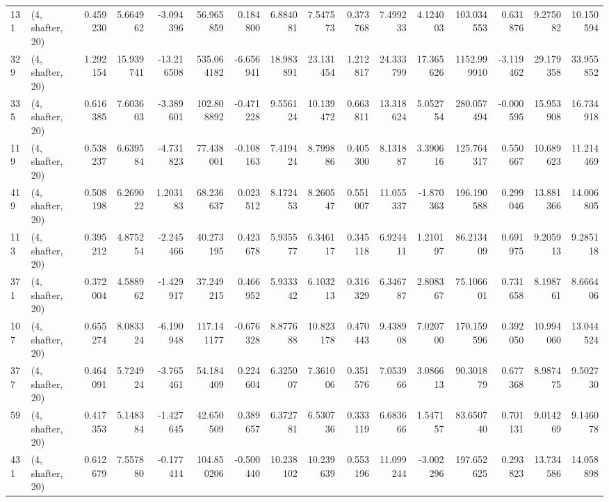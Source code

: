 \begin{tabular}{llrrrrrrrrrrrrrr}
131 &  (4, shafter, 20) &   0.459230 &   5.664962 &  -3.094396 &    56.965859 &   0.184800 &   6.884081 &   7.547573 &  0.373768 &   7.499233 &   4.124003 &    103.034553 &    0.631876 &    9.275082 &   10.150594 \\
329 &  (4, shafter, 20) &   1.292154 &  15.939741 & -13.216508 &   535.064182 &  -6.656941 &  18.983891 &  23.131454 &  1.212817 &  24.333799 &  17.365626 &   1152.999910 &   -3.119462 &   29.179358 &   33.955852 \\
335 &  (4, shafter, 20) &   0.616385 &   7.603603 &  -3.389601 &   102.808892 &  -0.471228 &   9.556124 &  10.139472 &  0.663811 &  13.318624 &   5.052754 &    280.057494 &   -0.000595 &   15.953908 &   16.734918 \\
119 &  (4, shafter, 20) &   0.538237 &   6.639584 &  -4.731823 &    77.438001 &  -0.108163 &   7.419424 &   8.799886 &  0.405300 &   8.131887 &   3.390616 &    125.764317 &    0.550667 &   10.689623 &   11.214469 \\
419 &  (4, shafter, 20) &   0.508198 &   6.269022 &   1.203183 &    68.236637 &   0.023512 &   8.172453 &   8.260547 &  0.551007 &  11.055337 &  -1.870363 &    196.190588 &    0.299046 &   13.881366 &   14.006805 \\
113 &  (4, shafter, 20) &   0.395212 &   4.875254 &  -2.245466 &    40.273195 &   0.423678 &   5.935577 &   6.346117 &  0.345118 &   6.924411 &   1.210197 &     86.213409 &    0.691975 &    9.205913 &    9.285118 \\
371 &  (4, shafter, 20) &   0.372004 &   4.588962 &  -1.429917 &    37.249215 &   0.466952 &   5.933342 &   6.103213 &  0.316329 &   6.346787 &   2.808367 &     75.106601 &    0.731658 &    8.198761 &    8.666406 \\
107 &  (4, shafter, 20) &   0.655274 &   8.083324 &  -6.190948 &   117.141177 &  -0.676328 &   8.877688 &  10.823178 &  0.470443 &   9.438908 &   7.020700 &    170.159596 &    0.392050 &   10.994060 &   13.044524 \\
377 &  (4, shafter, 20) &   0.464091 &   5.724924 &  -3.765461 &    54.184409 &   0.224604 &   6.325007 &   7.361006 &  0.351576 &   7.053966 &   3.086613 &     90.301879 &    0.677368 &    8.987475 &    9.502730 \\
59  &  (4, shafter, 20) &   0.417353 &   5.148384 &  -1.427645 &    42.650509 &   0.389657 &   6.372781 &   6.530736 &  0.333119 &   6.683666 &   1.547157 &     83.650740 &    0.701131 &    9.014269 &    9.146078 \\
431 &  (4, shafter, 20) &   0.612679 &   7.557880 &  -0.177414 &   104.850206 &  -0.500440 &  10.238102 &  10.239639 &  0.553196 &  11.099244 &  -3.002296 &    197.652625 &    0.293823 &   13.734586 &   14.058898 \\

\end{tabular}

